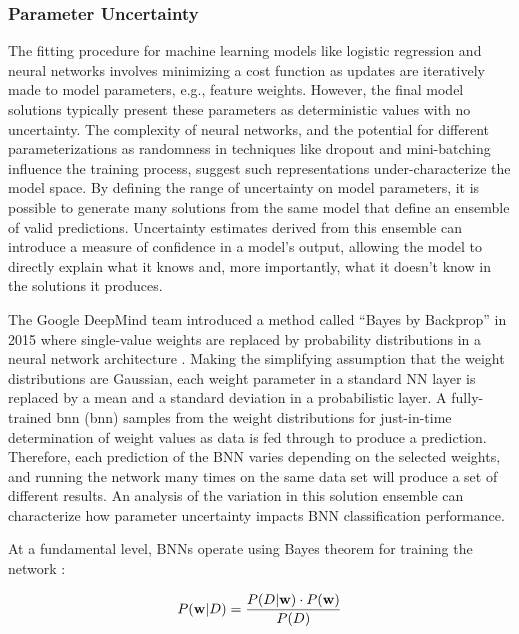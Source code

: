 \subsubsection{Parameter Uncertainty}

The fitting procedure for machine learning models like logistic regression and neural networks involves minimizing a cost function as updates are iteratively made to model parameters, e.g., feature weights. However, the final model solutions typically present these parameters as deterministic values with no uncertainty. The complexity of neural networks, and the potential for different parameterizations as randomness in techniques like dropout and mini-batching influence the training process, suggest such representations under-characterize the model space. By defining the range of uncertainty on model parameters, it is possible to generate many solutions from the same model that define an ensemble of valid predictions. Uncertainty estimates derived from this ensemble can introduce a measure of confidence in a model’s output, allowing the model to directly explain what it knows and, more importantly, what it doesn’t know in the solutions it produces.

The Google DeepMind team introduced a method called “Bayes by Backprop” in 2015 where single-value weights are replaced by probability distributions in a neural network architecture \citep{blundell_weight_2015}. Making the simplifying assumption that the weight distributions are Gaussian, each weight parameter in a standard NN layer is replaced by a mean and a standard deviation in a probabilistic layer. A fully-trained \acrlong{bnn} (\acrshort{bnn}) samples from the weight distributions for just-in-time determination of weight values as data is fed through to produce a prediction. Therefore, each prediction of the BNN varies depending on the selected weights, and running the network many times on the same data set will produce a set of different results. An analysis of the variation in this solution ensemble can characterize how parameter uncertainty impacts BNN classification performance.

At a fundamental level, BNNs operate using Bayes theorem for training the network \citep{webster_probabilistic_2021}:

\begin{equation}
    \label{eq:bayesrule}
    P({\bf w} \vert D) = \frac{P(D \vert {\bf w}) \cdot P({\bf w})}{P(D)}
\end{equation}

